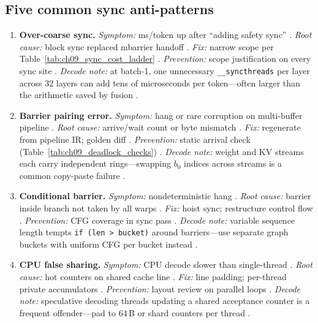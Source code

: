 \subsection{Five common sync anti-patterns}
\begin{enumerate}
\item \textbf{Over-coarse sync.}
\emph{Symptom:} ms/token up after ``adding safety sync'' \citep{taxbreak2026,patel2025llminference,shah2024flashattention3}.
\emph{Root cause:} block sync replaced mbarrier handoff \citep{semianalysis2024tma,yirage2026}.
\emph{Fix:} narrow scope per Table~\ref{tab:ch09_sync_cost_ladder} \citep{nvidia2022hopper}.
\emph{Prevention:} scope justification on every sync site \citep{chen2020compilerbasedhardw}.
\emph{Decode note:} at batch-1, one unnecessary \texttt{\_\_syncthreads} per layer across 32 layers can add tens of microseconds per token---often larger than the arithmetic saved by fusion \citep{patel2025llminference,memoryfloor2026}.

\item \textbf{Barrier pairing error.}
\emph{Symptom:} hang or rare corruption on multi-buffer pipeline \citep{shah2024flashattention3,semianalysis2024tma}.
\emph{Root cause:} arrive/wait count or byte mismatch \citep{nvidia2022hopper,yirage2026}.
\emph{Fix:} regenerate from pipeline IR; golden diff \citep{wu2024mirage,chen2020compilerbasedhardw}.
\emph{Prevention:} static arrival check (Table~\ref{tab:ch09_deadlock_checks}) \citep{yirage2026,chen2020compilerbasedhardw}.
\emph{Decode note:} weight and KV streams each carry independent rings---swapping $b_0$ indices across streams is a common copy-paste failure \citep{kwon2023vllm,dao2023flashdecoding}.

\item \textbf{Conditional barrier.}
\emph{Symptom:} nondeterministic hang \citep{nvidia2022hopper,shah2024flashattention3}.
\emph{Root cause:} barrier inside branch not taken by all warps \citep{yirage2026}.
\emph{Fix:} hoist sync; restructure control flow \citep{chen2020compilerbasedhardw,patel2025llminference}.
\emph{Prevention:} CFG coverage in sync pass \citep{wu2024mirage}.
\emph{Decode note:} variable sequence length tempts \texttt{if (len > bucket)} around barriers---use separate graph buckets with uniform CFG per bucket instead \citep{nvidia2024cudagraphs,kwon2023vllm}.

\item \textbf{CPU false sharing.}
\emph{Symptom:} CPU decode slower than single-thread \citep{dlbook,memoryfloor2026}.
\emph{Root cause:} hot counters on shared cache line \citep{patel2025llminference,taxbreak2026}.
\emph{Fix:} line padding; per-thread private accumulators \citep{chen2020compilerbasedhardw}.
\emph{Prevention:} layout review on parallel loops \citep{yirage2026}.
\emph{Decode note:} speculative decoding threads updating a shared acceptance counter is a frequent offender---pad to 64\,B or shard counters per thread \citep{patel2025llminference,dlbook}.


\end{enumerate}
